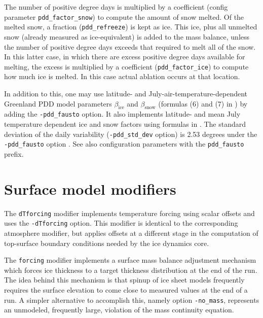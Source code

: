 \documentclass[titlepage,letterpaper,final]{scrartcl}
\newcommand{\intextoption}[1]{\texttt{-#1}\optindex{\texttt{-#1}}}
\begin{document}
The number of positive degree days is multiplied by a coefficient (config
parameter \texttt{pdd_factor_snow}) to compute the amount of snow melted. Of
the melted snow, a fraction (\texttt{pdd_refreeze}) is kept as ice. This ice,
plus all unmelted snow (already measured as ice-equivalent) is added to the
mass balance, unless the number of positive degree days exceeds that required
to melt all of the snow. In this latter case, in which there are excess
positive degree days available for melting, the excess is multiplied by a
coefficient (\texttt{pdd_factor_ice}) to compute how much ice is melted. In
this case actual ablation occurs at that location.

In addition to this, one may use latitude- and July-air-temperature-dependent
Greenland PDD model parameters $\beta_{\mathrm{ice}}$ and
$\beta_{\mathrm{snow}}$ (formulas (6) and (7) in \cite{Faustoetal2009}) by
adding the \intextoption{pdd_fausto} option. It also implements latitude- and
mean July temperature dependent ice and snow factors using formulas in
\cite{Faustoetal2009}. The standard deviation of the daily variability
(\intextoption{pdd_std_dev} option) is 2.53 degrees under the
\intextoption{pdd_fausto} option \cite{Faustoetal2009}. See also configuration
parameters with the \texttt{pdd_fausto} prefix.

\section{Surface model modifiers}
\label{sec:modifiers}

The \texttt{dTforcing} modifier implements temperature forcing using scalar
offsets and uses the \texttt{-dTforcing} option. This modifier is identical to
the corresponding atmosphere modifier, but applies offsets at a different stage
in the computation of top-surface boundary conditions needed by the ice
dynamics core.

The \texttt{forcing} modifier implements a surface mass balance adjustment
mechanism which forces ice thickness to a target thickness distribution at the
end of the run. The idea behind this mechanism is that spinup of ice sheet
models frequently requires the surface elevation to come close to measured
values at the end of a run. A simpler alternative to accomplish this, namely
option \intextoption{no_mass}, represents an unmodeled, frequently large,
violation of the mass continuity equation.
\end{document}
